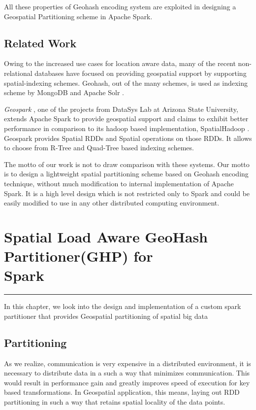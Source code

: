 \documentclass[article,type=msc,colorback,12pt,accentcolor=tud1d]{tudthesis}
\begin{document}
		    All these properties of Geohash encoding system are exploited in designing a Geospatial Partitioning scheme in Apache Spark. 
		   
		   \clearpage
		   \subsection{Related Work} 
		   
		   Owing to the increased use cases for location aware data, many of the recent non-relational databases have focused on providing geospatial support by supporting spatial-indexing schemes. Geohash, out of the many schemes,  is used as indexing scheme by 
		   MongoDB \cite{MongoDB} and Apache Solr \cite{apachesolr}. 
		   
		   \textit{Geospark }\cite{geospark}, one of the projects from DataSys Lab at Arizona State University, extends Apache Spark to provide geospatial support and claims to exhibit better performance in comparison to its hadoop based implementation, SpatialHadoop \cite{spatialhadoop}. Geospark provides Spatial RDDs and Spatial operations on those RDDs. It allows to choose from R-Tree and Quad-Tree based indexing schemes. 
		   
		   The motto of our work is not to draw comparison with these systems. Our motto is to design a lightweight spatial partitioning scheme based on Geohash encoding technique, without much modification to internal implementation of Apache Spark. It is a high level design which is not restricted only to Spark and could be easily modified to use in any other distributed computing environment. 
		   
		  
     \cleardoublepage
     \hfill
	\section[Spatial Load Aware GeoHash Partitioner(GHP) for Spark]{Spatial Load Aware GeoHash Partitioner(GHP) for \\Spark}
		\hfill \hrule	\hfill 
	In this chapter, we look into the design and implementation of a custom spark partitioner that provides  Geospatial partitioning of spatial big data
		\subsection{Partitioning}
			\par As we realize, communication is very expensive in a distributed environment, it is necessary to distribute data in a such a way that minimizes communication. This would result in performance gain and greatly improves speed of execution for key based transformations. In Geospatial application, this means, laying out RDD partitioning in such a way that retains spatial locality of the data points. 
			
\end{document}
